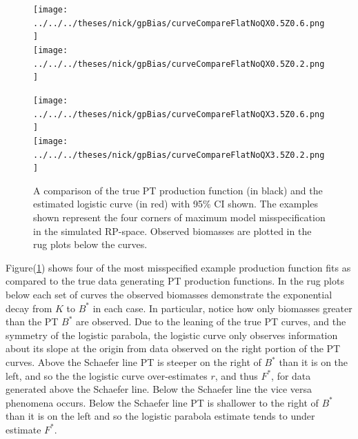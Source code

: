 \documentclass[12pt]{article}
\begin{document}
\clearpage
\begin{figure}[h!]
\begin{minipage}[h!]{0.349\textwidth}
\hspace*{-1cm}
\texttt{[image: ../../../theses/nick/gpBias/curveCompareFlatNoQX0.5Z0.6.png]}\\
\hspace*{-1cm}
\texttt{[image: ../../../theses/nick/gpBias/curveCompareFlatNoQX0.5Z0.2.png]}
\end{minipage}
\begin{minipage}[h!]{0.349\textwidth}
\hspace*{-1cm}
\texttt{[image: ../../../theses/nick/gpBias/curveCompareFlatNoQX3.5Z0.6.png]}\\
\hspace*{-1cm}
\texttt{[image: ../../../theses/nick/gpBias/curveCompareFlatNoQX3.5Z0.2.png]}
\end{minipage}
\begin{minipage}[h!]{0.29\textwidth}
\hspace*{-0.5cm}
\caption{\label{flatCurves}
A comparison of the true PT production function (in black) and the estimated logistic curve (in red) 
with 95\% CI shown. The examples shown represent the four corners of maximum model misspecification 
in the simulated RP-space. Observed biomasses are plotted in the rug plots below the curves.
}
\end{minipage}
\end{figure}

%
Figure(\ref{flatCurves}) shows four of the most misspecified example 
production function fits as compared to the true data generating PT production 
functions. In the rug plots below each set of curves the observed biomasses 
demonstrate the exponential decay from $K$ to $B^*$ in each case. In particular, 
notice how only biomasses greater than the PT $B^*$ are observed. Due to the 
leaning of the true PT curves, and the symmetry of the logistic parabola, the 
logistic curve only observes information about its slope at the origin from 
data observed on the right portion of the PT curves. Above the Schaefer line 
PT is steeper on the right of $B^*$ than it is on the left, and so the the 
logistic curve over-estimates $r$, and thus $F^*$, for data generated above 
the Schaefer line. Below the Schaefer line the vice versa phenomena occurs.
Below the Schaefer line PT is shallower to the right of $B^*$ than it is on the 
left and so the logistic parabola estimate tends to under estimate $F^*$.
\end{document}
